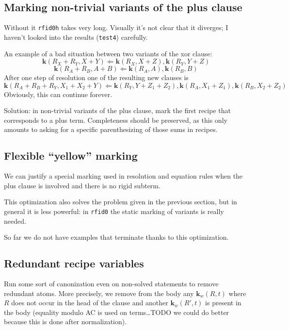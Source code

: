 \documentclass{article}
\newcommand{\mathcst}[1]{\mathrm{\textbf{#1}}}
\newcommand{\knows}{\mathcst{k}}
\newcommand{\from}{\Leftarrow}
\begin{document}
\subsection{Marking non-trivial variants of the plus clause}

Without it \verb#rfid0h# takes very long. Visually it's not clear
that it diverges; I haven't looked into the results (\verb#test4#)
carefully.

An example of a bad situation between two variants of the xor clause:
\[ \knows(R_X+R_Y,X+Y) \from \knows(R_X,X+Z), \knows(R_Y,Y+Z) \]
\[ \knows(R_A+R_B,A+B) \from \knows(R_A,A), \knows(R_B,B) \]
After one step of resolution one of the resulting new clauses is
\[ \knows(R_A+R_B+R_Y,X_1+X_2+Y) \from \knows(R_Y,Y+Z_1+Z_2),
     \knows(R_A,X_1+Z_1), \knows(R_B,X_2+Z_2) \]
Obviously, this can continue forever.

Solution: in non-trivial variants of the plus clause, mark the first
recipe that corresponds to a plus term. Completeness should be preserved,
as this only amounts to asking for a specific parenthesizing of those sums
in recipes.

\subsection{Flexible ``yellow'' marking}

We can justify a special marking used in resolution and equation
rules when the plus clause is involved and there is no rigid
subterm.

This optimization also solves the problem given in the previous
section, but in general it is less powerful: in \verb#rfid0#
the static marking of variants is really needed.

So far we do not have examples that terminate thanks to this
optimization.

\subsection{Redundant recipe variables}

Run some sort of canonization even on non-solved statements
to remove redundant atoms. More precisely, we remove from the body any
$\knows_w(R,t)$ where $R$ does not occur in the head of the clause
and another $\knows_w(R',t)$ is present in the body
(equality modulo AC is used on terms\ldots TODO we could do better because
this is done after normalization).
\end{document}
